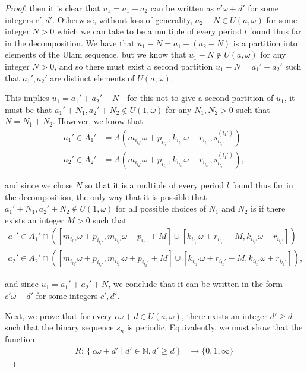 \documentclass{amsart}
\newcommand{\NN}{\mathbb{N}}
\theoremstyle{theorem}
\theoremstyle{definition}
\begin{document}
\begin{proof}
\noindent then it is clear that $u_1 = a_1 + a_2$ can be written as $c'\omega + d'$ for some integers $c',d'$. Otherwise, without loss of generality, $a_2 - N \in U(a,\omega)$ for some integer $N > 0$ which we can take to be a multiple of every period $l$ found thus far in the decomposition. We have that $u_1 - N = a_1 + (a_2 - N)$ is a partition into elements of the Ulam sequence, but we know that $u_1 - N \notin U(a,\omega)$ for any integer $N > 0$, and so there must exist a second partition $u_1 - N = a_1' + a_2'$ such that $a_1', a_2'$ are distinct elements of $U(a,\omega)$.
	
This implies $u_1 = a_1' + a_2' + N$---for this not to give a second partition of $u_1$, it must be that $a_1' + N_1, a_2' + N_2 \notin U(1,\omega)$ for any $N_1,N_2 > 0$ such that $N = N_1 + N_2$. However, we know that
	\begin{align*}
	a_1' \in A_1' &= A\left(m_{i_{l_1'}}\omega + p_{i_{l_1'}}, k_{i_{l_1'}}\omega + r_{i_{l_1'}},s^{(l_1')}_{i_{l_1'}}\right) \\
	a_2' \in A_2' &= A\left(m_{i_{l_2'}}\omega + p_{i_{l_2'}}, k_{i_{l_2'}}\omega + r_{i_{l_2'}},s^{(l_1')}_{i_{l_2'}}\right),
	\end{align*}
		
\noindent and since we chose $N$ so that it is a multiple of every period $l$ found thus far in the decomposition, the only way that it is possible that $a_1' + N_1, a_2' + N_2 \notin U(1,\omega)$ for all possible choices of $N_1$ and $N_2$ is if there exists an integer $M > 0$ such that
	\begin{align*}
	a_1' \in A_1' \cap \left([m_{i_{l_1'}}\omega + p_{i_{l_1'}}, m_{i_{l_1'}}\omega + p_{i_{l_1'}} + M] \cup [k_{i_{l_1'}}\omega + r_{i_{l_1'}} - M, k_{i_{l_1'}}\omega + r_{i_{l_1'}}]\right) \\
	a_2' \in A_2' \cap \left([m_{i_{l_2'}}\omega + p_{i_{l_2'}}, m_{i_{l_2}'}\omega + p_{i_{l_2}'} + M] \cup [k_{i_{l_2}'}\omega + r_{i_{l_2}'} - M, k_{i_{l_2}'}\omega + r_{i_{l_2}'}]\right),
	\end{align*}
		
\noindent and since $u_1 = a_1' + a_2' + N$, we conclude that it can be written in the form $c'\omega + d'$ for some integers $c',d'$.
	
Next, we prove that for every $c\omega + d \in U(a,\omega)$, there exists an integer $d' \geq d$ such that the binary sequence $s_n$ is periodic. Equivalently, we must show that the function
	\begin{align*}
	R: \left\{c\omega + d' \middle| d' \in \NN, d' \geq d\right\} &\rightarrow \{0,1,\infty\}
	\end{align*}
		

\end{proof}
\end{document}
